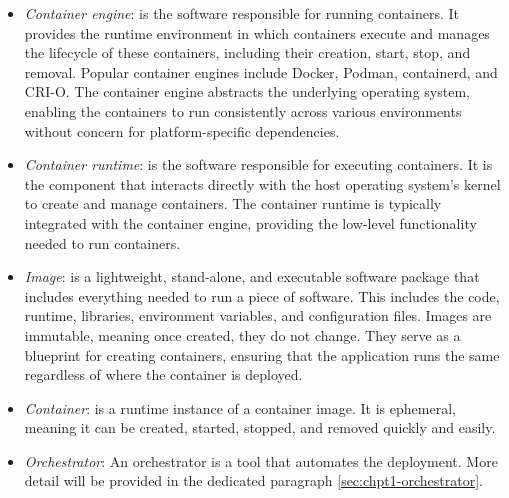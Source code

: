 \begin{itemize}
  \itemsep0em
  \item \textit{Container engine}: is the software responsible for running
    containers. It provides the runtime environment in which containers execute
    and manages the lifecycle of these containers, including their creation,
    start, stop, and removal. Popular container engines include Docker, Podman,
    containerd, and CRI-O. The container engine abstracts the underlying
    operating system, enabling the containers to run consistently across various
    environments without concern for platform-specific dependencies.
  \item \textit{Container runtime}: is the software responsible for executing
    containers. It is the component that interacts directly with the host
    operating system's kernel to create and manage containers. The container
    runtime is typically integrated with the container engine, providing the
    low-level functionality needed to run containers.
  \item \textit{Image}: is a lightweight, stand-alone, and executable software
    package that includes everything needed to run a piece of software. This
    includes the code, runtime, libraries, environment variables, and
    configuration files. Images are immutable, meaning once created, they do not
    change. They serve as a blueprint for creating containers, ensuring that the
    application runs the same regardless of where the container is deployed.
  \item \textit{Container}: is a runtime instance of a container image. It is
    ephemeral, meaning it can be created, started, stopped, and removed quickly
    and easily.
  \item \textit{Orchestrator}: An orchestrator is a tool that automates the
    deployment. More detail will be provided in the dedicated paragraph
    \ref{sec:chpt1-orchestrator}.
\end{itemize}

